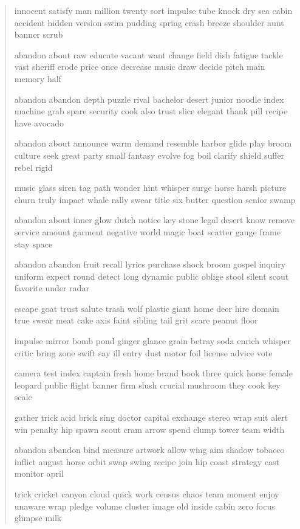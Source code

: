 \documentclass[a5paper, twoside]{book}
\begin{document}
\begin{verse}
 innocent satisfy man million twenty sort impulse tube knock dry sea cabin accident hidden version swim pudding spring crash breeze shoulder aunt banner scrub

 abandon about raw educate vacant want change field dish fatigue tackle vast sheriff erode price once decrease music draw decide pitch main memory half

 abandon abandon depth puzzle rival bachelor desert junior noodle index machine grab spare security cook also trust slice elegant thank pill recipe have avocado

 abandon about announce warm demand resemble harbor glide play broom culture seek great party small fantasy evolve fog boil clarify shield suffer rebel rigid

 music glass siren tag path wonder hint whisper surge horse harsh picture churn truly impact whale rally swear title six butter question senior swamp

 abandon about inner glow dutch notice key stone legal desert know remove service amount garment negative world magic boat scatter gauge frame stay space

 abandon abandon fruit recall lyrics purchase shock broom gospel inquiry uniform expect round detect long dynamic public oblige stool silent scout favorite under radar

 escape goat trust salute trash wolf plastic giant home deer hire domain true swear meat cake axis faint sibling tail grit scare peanut floor

 impulse mirror bomb pond ginger glance grain betray soda enrich whisper critic bring zone swift say ill entry dust motor foil license advice vote

 camera test index captain fresh home brand book three quick horse female leopard public flight banner firm slush crucial mushroom they cook key scale

 gather trick acid brick sing doctor capital exchange stereo wrap suit alert win penalty hip spawn scout cram arrow spend clump tower team width

 abandon abandon bind measure artwork allow wing aim shadow tobacco inflict august horse orbit swap swing recipe join hip coast strategy east monitor april

 trick cricket canyon cloud quick work census chaos team moment enjoy unaware wrap pledge volume cluster image old inside cabin zero focus glimpse milk


\end{verse}
\end{document}
